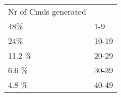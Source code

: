 \begin{longtable}{l l}
Nr of Cmds generated\\
48\% & 1-9\\
24\% & 10-19\\
11.2 \% & 20-29\\
6.6 \% & 30-39\\
4.8 \% & 40-49\\

\end{longtable}
